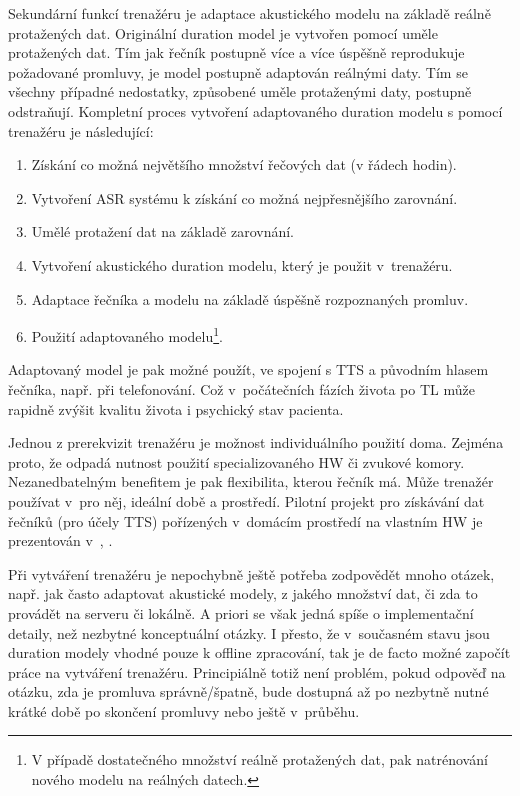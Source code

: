 Sekundární funkcí trenažéru je adaptace akustického modelu na základě reálně protažených dat. Originální duration model je vytvořen pomocí uměle protažených dat. Tím jak řečník postupně více a více úspěšně reprodukuje požadované promluvy, je model postupně adaptován reálnými daty. Tím se všechny případné nedostatky, způsobené uměle protaženými daty, postupně odstraňují. Kompletní proces vytvoření adaptovaného duration modelu s pomocí trenažéru je následující:

\begin{enumerate}
  \item Získání co možná největšího množství řečových dat (v řádech hodin).
  \item Vytvoření ASR systému k získání co možná nejpřesnějšího zarovnání.
  \item Umělé protažení dat na základě zarovnání.
  \item Vytvoření akustického duration modelu, který je použit v~trenažéru.
  \item Adaptace řečníka a modelu na základě úspěšně rozpoznaných promluv.
  \item Použití adaptovaného modelu\footnote{V případě dostatečného množství reálně protažených dat, pak natrénování nového modelu na reálných datech.}.
\end{enumerate}

\noindent Adaptovaný model je pak možné použít, ve spojení s TTS a původním hlasem řečníka, např. při telefonování. Což v~počátečních fázích života po TL může rapidně zvýšit kvalitu života i psychický stav pacienta. \cite{Mertl2018}

Jednou z prerekvizit trenažéru je možnost individuálního použití doma. Zejména proto, že odpadá nutnost použití specializovaného HW  či zvukové komory. Nezanedbatelným benefitem je pak flexibilita, kterou řečník má. Může trenažér používat v~pro něj, ideální době a prostředí. Pilotní projekt pro získávání dat řečníků (pro účely TTS) pořízených v~domácím prostředí na vlastním HW je prezentován v~\cite{Juzova2015}, \cite{Juzova2017}.

Při vytváření trenažéru je nepochybně ještě potřeba zodpovědět mnoho otázek,  např. jak často adaptovat akustické modely, z jakého množství dat, či zda to provádět na serveru či lokálně. A priori se však jedná spíše o implementační detaily, než nezbytné konceptuální otázky. I přesto, že v~současném stavu jsou duration modely vhodné pouze k offline zpracování, tak je de facto možné započít práce na vytváření trenažéru. Principiálně totiž není problém, pokud odpověď na otázku, zda je promluva správně/špatně, bude dostupná až po nezbytně nutné krátké době po skončení promluvy nebo ještě v~průběhu.

